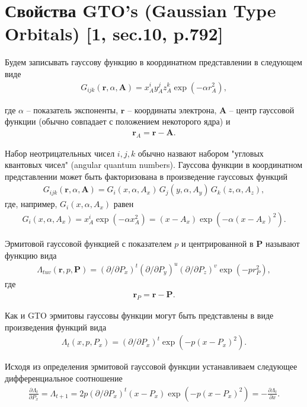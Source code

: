 \documentclass[a4paper,12pt]{extarticle}
\newcommand{\lb}{\left(}
\newcommand{\rb}{\right)}
\newcommand{\mf}{\mathbf}
\newcommand{\vr}{\mathbf{r}}
\begin{document}
\section*{Свойства GTO's (Gaussian Type Orbitals) [1, sec.10, p.792]}
Будем записывать гауссову функцию в координатном представлении в следующем виде
\begin{gather}
	G_{ijk}(\vr, \alpha, \mf{A}) = x_A^i y_A^j z_A^k \exp \lb - \alpha r_A^2 \rb,
\end{gather}

где $\alpha$ -- показатель экспоненты, $\vr$ -- координаты электрона, $\mf{A}$ -- центр гауссовой функции (обычно совпадает с положением некоторого ядра) и 
\begin{gather}
	\vr_A = \mf{r} - \mf{A}.
\end{gather}

Набор неотрицательных чисел $i, j, k$ обычно назвают набором "угловых квантовых чисел" (angular quantum numbers). Гауссова функции в координатном представлении может быть факторизована в произведение гауссовых функций
\begin{gather}
	G_{ijk}(\vr, \alpha, \mf{A}) = G_i(x, \alpha, A_x) \, G_j(y, \alpha, A_y) \, G_k(z, \alpha, A_z), 
\end{gather}
где, например, $G_i(x, \alpha, A_x)$ равен
\begin{gather}
	G_i(x, \alpha, A_x) = x_A^i \exp ( -\alpha x_A^2 ) = (x - A_x) \exp \lb - \alpha ( x - A_x )^2 \rb.
\end{gather} 

Эрмитовой гауссовой функцией с показателем $p$ и центрированной в $\mf{P}$ называют функцию вида
\begin{gather}
	\Lambda_{tuv}(\vr, p, \mf{P}) = (\partial / \partial P_x)^t (\partial / \partial P_y)^u (\partial / \partial P_z)^v \exp (-p r_P^2 ),
\end{gather}
где
\begin{gather}
	\vr_P = \vr - \mf{P}.
\end{gather}

Как и GTO эрмитовы гауссовы функции могут быть представлены в виде произведения функций вида
\begin{gather}
	\Lambda_t(x, p, P_x) = (\partial / \partial P_x)^t \exp (-p (x - P_x)^2).
\end{gather}

Исходя из определения эрмитовой гауссовой функции устанавливаем следующее дифференциальное соотношение
\begin{gather}
		\frac{\partial \Lambda_t}{\partial P_x} = \Lambda_{t + 1} = 2p (\partial / \partial P_x)^t (x - P_x) \exp(-p(x - P_x)^2) = - \frac{\partial \Lambda_t}{\partial x}. 
\end{gather}
\end{document}
